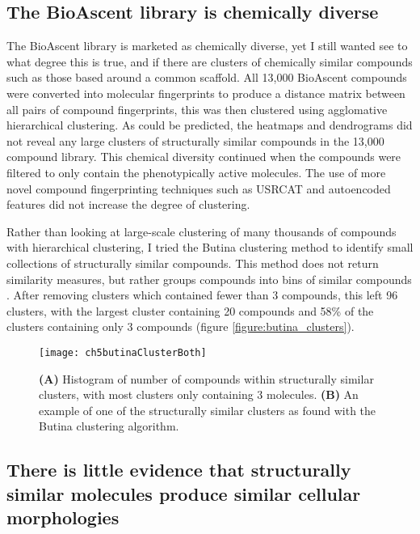 \documentclass[a4paper,11pt,twoside,openright]{scrbook}
\begin{document}
\subsection{The BioAscent library is chemically diverse}
The BioAscent library is marketed as chemically diverse, yet I still wanted see to what degree this is true, and if there are clusters of chemically similar compounds such as those based around a common scaffold.
All 13,000 BioAscent compounds were converted into molecular fingerprints to produce a distance matrix between all pairs of compound fingerprints, this was then clustered using agglomative hierarchical clustering.
As could be predicted, the heatmaps and dendrograms did not reveal any large clusters of structurally similar compounds in the 13,000 compound library.
This chemical diversity continued when the compounds were filtered to only contain the phenotypically active molecules.
The use of more novel compound fingerprinting techniques such as USRCAT \cite{usercat} and autoencoded features \cite{autoencoder} did not increase the degree of clustering.


Rather than looking at large-scale clustering of many thousands of compounds with hierarchical clustering, I tried the Butina clustering method to identify small collections of structurally similar compounds.
This method does not return similarity measures, but rather groups compounds into bins of similar compounds \cite{Butina1999}.
After removing clusters which contained fewer than 3 compounds, this left 96 clusters, with the largest cluster containing 20 compounds and 58\% of the clusters containing only 3 compounds (figure \ref{figure:butina_clusters}).

\begin{figure}
    \captionsetup{width=0.8\textwidth}
    \caption[Histogram of structural cluster sizes and example of molecules within a cluster]{
        \textbf{(A)} Histogram of number of compounds within structurally similar clusters, with most clusters only containing 3 molecules.
        \textbf{(B)} An example of one of the structurally similar clusters as found with the Butina clustering algorithm. 
}
    \texttt{[image: ch5butinaClusterBoth]}
    \label{figure:butina_clusers}
\end{figure}



\subsection{There is little evidence that structurally similar molecules produce similar cellular morphologies}
\end{document}
